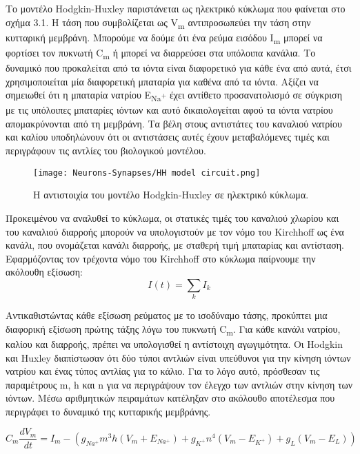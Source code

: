 \documentclass[12pt]{report}
\begin{document}
Το μοντέλο \textlatin{Hodgkin-Huxley} παριστάνεται ως ηλεκτρικό κύκλωμα που φαίνεται στο σχήμα 3.1. Η τάση που συμβολίζεται ως \textlatin{V\textsubscript{m}} αντιπροσωπεύει την τάση στην κυτταρική μεμβράνη. Μπορούμε να δούμε ότι ένα ρεύμα εισόδου I\textsubscript{m} μπορεί να φορτίσει τον πυκνωτή \textlatin{C\textsubscript{m}} ή μπορεί να διαρρεύσει στα υπόλοιπα κανάλια. Το δυναμικό που προκαλείται από τα ιόντα είναι διαφορετικό για κάθε ένα από αυτά, έτσι χρησιμοποιείται μία διαφορετική μπαταρία για καθένα από τα ιόντα. Αξίζει να σημειωθεί ότι η μπαταρία νατρίου \textlatin{E\textsubscript{Na\textsuperscript{+}}} έχει αντίθετο προσανατολισμό σε σύγκριση με τις υπόλοιπες μπαταρίες ιόντων και αυτό δικαιολογείται αφού τα ιόντα νατρίου απομακρύνονται από τη μεμβράνη. Τα βέλη στους αντιστάτες του καναλιού νατρίου και καλίου υποδηλώνουν ότι οι αντιστάσεις αυτές έχουν μεταβαλόμενες τιμές και περιγράφουν τις αντλίες του βιολογικού μοντέλου.

\begin{figure}[htp]
    \centering
    \texttt{[image: Neurons-Synapses/HH model circuit.png]}
    \caption{Η αντιστοιχία του μοντέλο \textlatin{Hodgkin-Huxley} σε ηλεκτρικό κύκλωμα.}
    \label{fig:neurons-multipolar}
\end{figure}

Προκειμένου να αναλυθεί το κύκλωμα, οι στατικές τιμές του καναλιού χλωρίου και του καναλιού διαρροής μπορούν να υπολογιστούν με τον νόμο του \textlatin{Kirchhoff} ως ένα κανάλι, που ονομάζεται κανάλι διαρροής, με σταθερή τιμή μπαταρίας και αντίσταση. Εφαρμόζοντας τον τρέχοντα νόμο του \textlatin{Kirchhoff} στο κύκλωμα παίρνουμε την ακόλουθη εξίσωση: \[I(t)=\sum_{k}I_k\]

Αντικαθιστώντας κάθε εξίσωση ρεύματος με το ισοδύναμο τάσης, προκύπτει μια διαφορική εξίσωση πρώτης τάξης λόγω του πυκνωτή \textlatin{C\textsubscript{m}}. Για κάθε κανάλι νατρίου, καλίου και διαρροής, πρέπει να υπολογισθεί η αντίστοιχη αγωγιμότητα. Οι \textlatin{Hodgkin} και \textlatin{Huxley} διαπίστωσαν ότι δύο τύποι αντλιών είναι υπεύθυνοι για την κίνηση ιόντων νατρίου και ένας τύπος αντλίας για το κάλιο. Για το λόγο αυτό, πρόσθεσαν τις παραμέτρους \textlatin{m, h} και \textlatin{n} για να περιγράψουν τον έλεγχο των αντλιών στην κίνηση των ιόντων. Μέσω αριθμητικών πειραμάτων κατέληξαν στο ακόλουθο αποτέλεσμα που περιγράφει το δυναμικό της κυτταρικής μεμβράνης.

\begin{equation}
C_m\frac{dV_m}{dt} = I_m - (g_{Na^+}m^3h(V_m+E_{Na^+}) + g_{K^+}n^4(V_m-E_{K^+}) + g_L(V_m-E_L))
\end{equation}
\end{document}
